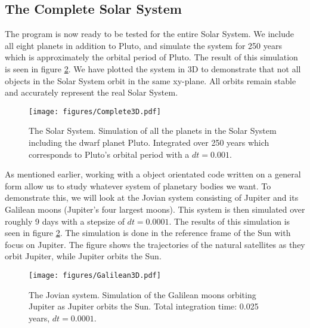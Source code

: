 \documentclass[a4paper, 10pt, reqno]{amsart}
\begin{document}
\subsection{The Complete Solar System} The program is now ready to be tested for the entire Solar System. We include all eight planets in addition to Pluto, and simulate the system for 250 years which is approximately the orbital period of Pluto. The result of this simulation is seen in figure \ref{fig:galilean}. We have plotted the system in 3D to demonstrate that not all objects in the Solar System orbit in the same xy-plane. All orbits remain stable and accurately represent the real Solar System.

\begin{figure}
  \centering
    \texttt{[image: figures/Complete3D.pdf]}
      \caption{The Solar System. Simulation of all the planets in the Solar System including the dwarf planet Pluto. Integrated over 250 years which corresponds to Pluto's orbital period with a $dt = 0.001$. }
        \label{fig:complete}
\end{figure}

As mentioned earlier, working with a object orientated code written on a general form allow us to study whatever system of planetary bodies we want. To demonstrate this, we will look at the Jovian system consisting of Jupiter and its Galilean moons (Jupiter's four largest moons). This system is then simulated over roughly 9 days with a stepsize of $dt = 0.0001$. The results of this simulation is seen in figure \ref{fig:galilean}. The simulation is done in the reference frame of the Sun with focus on Jupiter. The figure shows the trajectories of the natural satellites as they orbit Jupiter, while Jupiter orbits the Sun.

\begin{figure}
  \centering
    \texttt{[image: figures/Galilean3D.pdf]}
      \caption{The Jovian system. Simulation of the Galilean moons orbiting Jupiter as Jupiter orbits the Sun. Total integration time: 0.025 years, $dt = 0.0001$. }
        \label{fig:galilean}
\end{figure}
\end{document}
